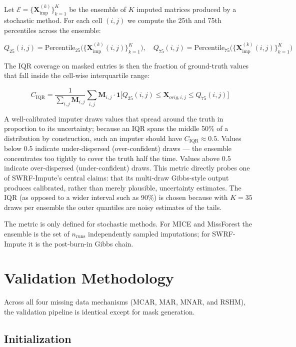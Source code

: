 \documentclass[preprint]{aastex631}
\begin{document}
Let $\mathcal{E} = \{\mathbf{X}_{\text{imp}}^{(k)}\}_{k=1}^{K}$ be the ensemble of $K$ imputed matrices produced by a stochastic method. For each cell $(i,j)$ we compute the 25th and 75th percentiles across the ensemble:

\begin{equation}
  Q_{25}(i,j) = \text{Percentile}_{25}\bigl(\{\mathbf{X}_{\text{imp}}^{(k)}(i,j)\}_{k=1}^{K}\bigr), \quad
  Q_{75}(i,j) = \text{Percentile}_{75}\bigl(\{\mathbf{X}_{\text{imp}}^{(k)}(i,j)\}_{k=1}^{K}\bigr)
\end{equation}

The IQR coverage on masked entries is then the fraction of ground-truth values that fall inside the cell-wise interquartile range:

\begin{equation}
  C_{\text{IQR}} = \frac{1}{\sum_{i,j} \mathbf{M}_{i,j}} \sum_{i,j} \mathbf{M}_{i,j} \cdot \mathbf{1}\bigl[Q_{25}(i,j) \leq \mathbf{X}_{orig,i,j} \leq Q_{75}(i,j)\bigr]
\end{equation}

A well-calibrated imputer draws values that spread around the truth in proportion to its uncertainty; because an IQR spans the middle 50\% of a distribution by construction, such an imputer should have $C_{\text{IQR}} \approx 0.5$. Values below $0.5$ indicate under-dispersed (over-confident) draws --- the ensemble concentrates too tightly to cover the truth half the time. Values above $0.5$ indicate over-dispersed (under-confident) draws. This metric directly probes one of SWRF-Impute's central claims: that its multi-draw Gibbs-style output produces calibrated, rather than merely plausible, uncertainty estimates. The IQR (as opposed to a wider interval such as 90\%) is chosen because with $K = 35$ draws per ensemble the outer quantiles are noisy estimates of the tails.

The metric is only defined for stochastic methods. For MICE and MissForest the ensemble is the set of $n_{\text{runs}}$ independently sampled imputations; for SWRF-Impute it is the post-burn-in Gibbs chain.

\section{Validation Methodology}

Across all four missing data mechanisms (MCAR, MAR, MNAR, and RSHM), the validation pipeline is identical except for mask generation.

\subsection{Initialization}
\end{document}
